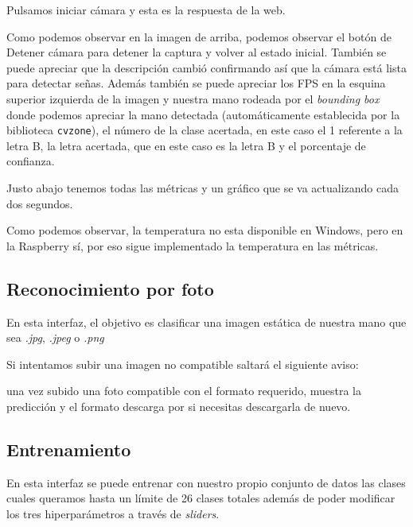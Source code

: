 
Pulsamos iniciar cámara y esta es la respuesta de la web.


Como podemos observar en la imagen de arriba, podemos observar el botón de Detener cámara para detener la captura y volver al estado inicial. También se puede apreciar que la descripción cambió confirmando así que la cámara está lista para detectar señas. Además también se puede apreciar los FPS en la esquina superior izquierda de la imagen y nuestra mano rodeada por el \textit{bounding box} donde podemos apreciar la mano detectada (automáticamente establecida por la biblioteca \texttt{cvzone}), el número de la clase acertada, en este caso el 1 referente a la letra B, la letra acertada, que en este caso es la letra B y el porcentaje de confianza.

Justo abajo tenemos todas las métricas y un gráfico que se va actualizando cada dos segundos.


Como podemos observar, la temperatura no esta disponible en Windows, pero en la Raspberry sí, por eso sigue implementado la temperatura en las métricas.

\subsection{Reconocimiento por foto}
En esta interfaz, el objetivo es clasificar una imagen estática de nuestra mano que sea \textit{.jpg}, \textit{.jpeg} o \textit{.png} 


Si intentamos subir una imagen no compatible saltará el siguiente aviso:


una vez subido una foto compatible con el formato requerido, muestra la predicción y el formato descarga por si necesitas descargarla de nuevo.


\subsection{Entrenamiento}
En esta interfaz se puede entrenar con nuestro propio conjunto de datos las clases cuales queramos hasta un límite de 26 clases totales además de poder modificar los tres hiperparámetros a través de \textit{sliders}.

